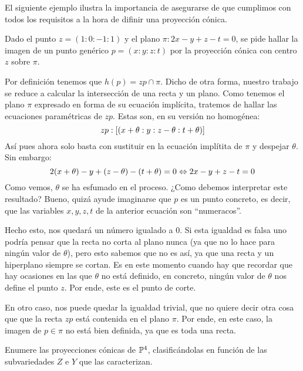 El siguiente ejemplo ilustra la importancia de asegurarse de que cumplimos con todos los requisitos a la hora de difinir una proyección cónica.
\begin{exa}
	Dado el punto $z=(1:0:-1:1)$ y el plano $\pi:2x-y+z-t=0$, se pide hallar la imagen de un punto genérico $p=(x:y:z:t)$ por la proyección cónica con centro $z$ sobre $\pi$.
	
	Por definición tenemos que $h(p)=zp\cap\pi$. Dicho de otra forma, nuestro trabajo se reduce a calcular la intersección de una recta y un plano. Como tenemos el plano $\pi$ expresado en forma de su ecuación implícita, tratemos de hallar las ecuaciones paramétricas de $zp$. Estas son, en su versión no homogénea:
	\[zp:\left [ (x+\theta:y:z-\theta:t+\theta) \right ]\]
	Así pues ahora solo basta con sustituir en la ecuación implítita de $\pi$ y despejar $\theta$. Sin embargo:
	\[2(x+\theta)-y+(z-\theta)-(t+\theta)=0\Leftrightarrow2x-y+z-t=0\]
	Como vemos, $\theta$ se ha esfumado en el proceso. ¿Como debemos interpretar este resultado? Bueno, quizá ayude imaginarse que $p$ es un punto concreto, es decir, que las variables $x,y,z,t$ de la anterior ecuación son ``numeracos''.
	
	Hecho esto, nos quedará un número igualado a $0$. Si esta igualdad es falsa uno podría pensar que la recta no corta al plano nunca (ya que no lo hace para ningún valor de $\theta$), pero esto sabemos que no es así, ya que una recta y un hiperplano siempre se cortan. Es en este momento cuando hay que recordar que hay ocasiones en las que $\theta$ no está definido, en concreto, ningún valor de $\theta$ nos define el punto $z$. Por ende, este es el punto de corte.
	
	En otro caso, nos puede quedar la igualdad trivial, que no quiere decir otra cosa que que la recta $zp$ está contenida en el plano $\pi$. Por ende, en este caso, la imagen de $p\in\pi$ no está bien definida, ya que es toda una recta.
\end{exa}
\begin{exerc}
	Enumere las proyecciones cónicas de $\mathbb{P}^4$, clasificándolas en función de las subvariedades $Z$ e $Y$ que las caracterizan.
\end{exerc}

